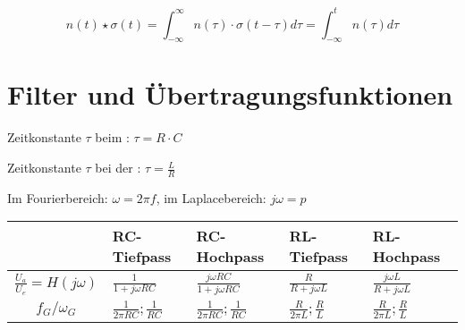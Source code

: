 \documentclass[12pt, a4paper, twoside]{scrartcl}
\begin{document}
\[n(t) \star \sigma (t) = \int_{-\infty}^{\infty} n(\tau) \cdot \sigma(t - \tau) d\tau = \int_{-\infty}^t n(\tau) d\tau\]

\section{Filter und Übertragungsfunktionen}

Zeitkonstante \(\tau\) beim : \dotfill \(\tau = R \cdot C\)

Zeitkonstante \(\tau\) bei der : \dotfill \(\tau = \frac{L}{R}\)

Im Fourierbereich: \(\omega = 2 \pi f\), im Laplacebereich: \(j\omega = p\)

{\centering
  \begin{tabular}{cllll}
    \toprule
    & \textbf{RC-Tiefpass} & \textbf{RC-Hochpass} & \textbf{RL-Tiefpass} & \textbf{RL-Hochpass}\\
    \midrule
    \textbf{\(\displaystyle\frac{U_a}{U_e} = H(j\omega)\)} & \(\displaystyle\frac{1}{1 + j\omega R C}\) & \(\displaystyle\frac{j\omega RC}{1 + j\omega RC}\) & \(\displaystyle\frac{R}{R + j \omega L}\)& \(\displaystyle\frac{j\omega L}{R + j \omega L}\) \\[1em]
    \textbf{\(\displaystyle f_G / \omega_G\)} & \(\displaystyle\frac{1}{2 \pi R C}; \frac{1}{RC}\) & \(\displaystyle\frac{1}{2 \pi R C}; \frac{1}{RC}\) & \(\displaystyle\frac{R}{2 \pi L}; \frac{R}{L}\) & \(\displaystyle\frac{R}{2 \pi L}; \frac{R}{L}\)\\
    \bottomrule
  \end{tabular}\par
}
\end{document}
